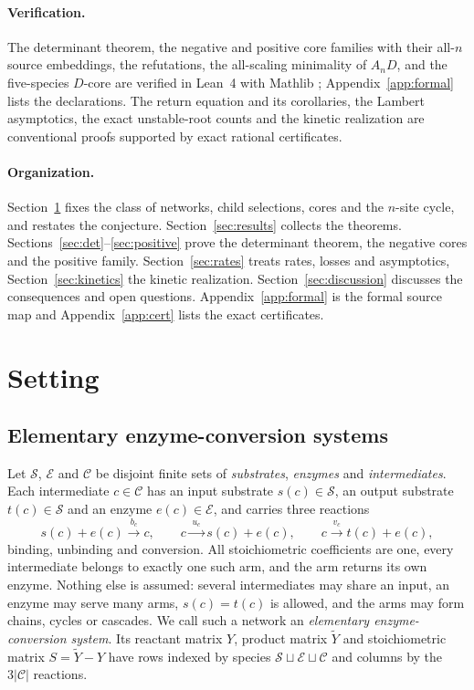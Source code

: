 \documentclass[11pt,a4paper]{article}
\theoremstyle{plain}
\theoremstyle{definition}
\theoremstyle{remark}
\newcommand{\cS}{\mathcal S}
\newcommand{\cE}{\mathcal E}
\newcommand{\cC}{\mathcal C}
\begin{document}
\paragraph{Verification.}
The determinant theorem, the negative and positive core families with their all-$n$ source embeddings, the refutations, the all-scaling minimality of $A_nD$, and the five-species $D$-core are verified in Lean~4 with Mathlib \citep{Lean4,Mathlib}; Appendix~\ref{app:formal} lists the declarations. The return equation and its corollaries, the Lambert asymptotics, the exact unstable-root counts and the kinetic realization are conventional proofs supported by exact rational certificates.

\paragraph{Organization.}
Section~\ref{sec:setting} fixes the class of networks, child selections, cores and the $n$-site cycle, and restates the conjecture. Section~\ref{sec:results} collects the theorems. Sections~\ref{sec:det}--\ref{sec:positive} prove the determinant theorem, the negative cores and the positive family. Section~\ref{sec:rates} treats rates, losses and asymptotics, Section~\ref{sec:kinetics} the kinetic realization. Section~\ref{sec:discussion} discusses the consequences and open questions. Appendix~\ref{app:formal} is the formal source map and Appendix~\ref{app:cert} lists the exact certificates.

\section{Setting}\label{sec:setting}

\subsection{Elementary enzyme-conversion systems}
Let $\cS$, $\cE$ and $\cC$ be disjoint finite sets of \emph{substrates}, \emph{enzymes} and \emph{intermediates}. Each intermediate $c\in\cC$ has an input substrate $s(c)\in\cS$, an output substrate $t(c)\in\cS$ and an enzyme $e(c)\in\cE$, and carries three reactions
\begin{equation}\label{eq:arms}
s(c)+e(c)\xrightarrow{\;b_c\;}c,\qquad
c\xrightarrow{\;u_c\;}s(c)+e(c),\qquad
c\xrightarrow{\;v_c\;}t(c)+e(c),
\end{equation}
binding, unbinding and conversion. All stoichiometric coefficients are one, every intermediate belongs to exactly one such arm, and the arm returns its own enzyme. Nothing else is assumed: several intermediates may share an input, an enzyme may serve many arms, $s(c)=t(c)$ is allowed, and the arms may form chains, cycles or cascades. We call such a network an \emph{elementary enzyme-conversion system}. Its reactant matrix $Y$, product matrix $\widetilde Y$ and stoichiometric matrix $S=\widetilde Y-Y$ have rows indexed by species $\cS\sqcup\cE\sqcup\cC$ and columns by the $3|\cC|$ reactions.
\end{document}
